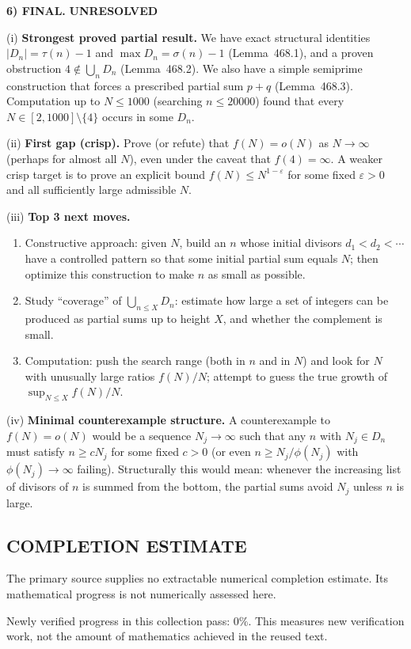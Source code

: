 \medskip
\noindent\textbf{6) FINAL.} \textbf{UNRESOLVED}

(i) \textbf{Strongest proved partial result.}
We have exact structural identities $|D_n|=\tau(n)-1$ and $\max D_n=\sigma(n)-1$ (Lemma~468.1), and a proven obstruction $4\notin \bigcup_n D_n$ (Lemma~468.2). We also have a simple semiprime construction that forces a prescribed partial sum $p+q$ (Lemma~468.3). Computation up to $N\le 1000$ (searching $n\le 20000$) found that every $N\in[2,1000]\setminus\{4\}$ occurs in some $D_n$.

(ii) \textbf{First gap (crisp).}
Prove (or refute) that $f(N)=o(N)$ as $N\to\infty$ (perhaps for almost all $N$), even under the caveat that $f(4)=\infty$. A weaker crisp target is to prove an explicit bound $f(N)\le N^{1-\varepsilon}$ for some fixed $\varepsilon>0$ and all sufficiently large admissible $N$.

(iii) \textbf{Top 3 next moves.}
\begin{enumerate}
\item Constructive approach: given $N$, build an $n$ whose initial divisors $d_1<d_2<\cdots$ have a controlled pattern so that some initial partial sum equals $N$; then optimize this construction to make $n$ as small as possible.
\item Study ``coverage'' of $\bigcup_{n\le X} D_n$: estimate how large a set of integers can be produced as partial sums up to height $X$, and whether the complement is small.
\item Computation: push the search range (both in $n$ and in $N$) and look for $N$ with unusually large ratios $f(N)/N$; attempt to guess the true growth of $\sup_{N\le X} f(N)/N$.
\end{enumerate}

(iv) \textbf{Minimal counterexample structure.}
A counterexample to $f(N)=o(N)$ would be a sequence $N_j\to\infty$ such that any $n$ with $N_j\in D_n$ must satisfy $n\ge cN_j$ for some fixed $c>0$ (or even $n\ge N_j/\phi(N_j)$ with $\phi(N_j)\to\infty$ failing). Structurally this would mean: whenever the increasing list of divisors of $n$ is summed from the bottom, the partial sums avoid $N_j$ unless $n$ is large.




\subsection*{COMPLETION ESTIMATE}
The primary source supplies no extractable numerical completion estimate. Its mathematical progress is not numerically assessed here.

Newly verified progress in this collection pass: $0\%$. This measures new verification work, not the amount of mathematics achieved in the reused text.
